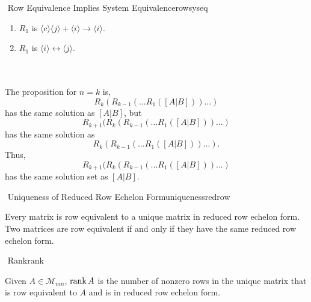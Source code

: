 \begin{theorem}{\Stop\,\,Row Equivalence Implies System Equivalence}{rowsyseq}
\begin{enumerate}
\begin{align*}
                    \end{align*}
                    We see that the solution sets are the same. The first and third rows are the same, so the solution sets will be the same. For the second row, simply factor by \(c\) and divide.
                \item \(R_1\) is \(\langle c\rangle\langle j \rangle+\langle i\rangle\to \langle i\rangle\).
                \item \(R_1\) is \(\langle i \rangle \leftrightarrow \langle j\rangle\).
            \end{enumerate}
            \vphantom
            \\
            \\
            The proposition for \(n=k\) is,
            \begin{equation*}
                R_k(R_{k-1}(\ldots R_1([A|B]))\ldots)
            \end{equation*}
            has the same solution as \([A|B]\), but
            \begin{equation*}
                R_{k+1}(R_k(R_{k-1}(\ldots R_1([A|B]))\ldots)
            \end{equation*}
            has the same solution as
            \begin{equation*}
                R_k(R_{k-1}(\ldots R_1([A|B]))\ldots).
            \end{equation*}
            Thus, 
            \begin{equation*}
                R_{k+1}(R_k(R_{k-1}(\ldots R_1([A|B]))\ldots)
            \end{equation*}
            has the same solution set as \([A|B]\).
        \end{theorem}
        \begin{theorem}{\Stop\,\,Uniqueness of Reduced Row Echelon Form}{uniquenessredrow}
        
            Every matrix is row equivalent to a unique matrix in reduced row echelon form. Two matrices are row equivalent if and only if they have the same reduced row echelon form.
            
        \end{theorem}
        \begin{definition}{\Stop\,\,Rank}{rank}
        
            Given \(A\in\mathcal{M}_{mn}\), \(\text{rank\,}{A}\) is the number of nonzero rows in the unique matrix that is row equivalent to \(A\) and is in reduced row echelon form.
            
        \end{definition}
